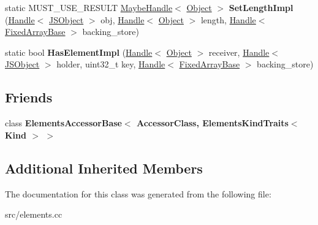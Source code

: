 \begin{DoxyCompactItemize}
\item 
\hypertarget{classv8_1_1internal_1_1_typed_elements_accessor_acb9d71e562ee58e7f2aadcebfccb999a}{}static M\+U\+S\+T\+\_\+\+U\+S\+E\+\_\+\+R\+E\+S\+U\+L\+T \hyperlink{classv8_1_1internal_1_1_maybe_handle}{Maybe\+Handle}$<$ \hyperlink{classv8_1_1internal_1_1_object}{Object} $>$ {\bfseries Set\+Length\+Impl} (\hyperlink{classv8_1_1internal_1_1_handle}{Handle}$<$ \hyperlink{classv8_1_1internal_1_1_j_s_object}{J\+S\+Object} $>$ obj, \hyperlink{classv8_1_1internal_1_1_handle}{Handle}$<$ \hyperlink{classv8_1_1internal_1_1_object}{Object} $>$ length, \hyperlink{classv8_1_1internal_1_1_handle}{Handle}$<$ \hyperlink{classv8_1_1internal_1_1_fixed_array_base}{Fixed\+Array\+Base} $>$ backing\+\_\+store)\label{classv8_1_1internal_1_1_typed_elements_accessor_acb9d71e562ee58e7f2aadcebfccb999a}

\item 
\hypertarget{classv8_1_1internal_1_1_typed_elements_accessor_a10c24f181323e51edcc62debf963f934}{}static bool {\bfseries Has\+Element\+Impl} (\hyperlink{classv8_1_1internal_1_1_handle}{Handle}$<$ \hyperlink{classv8_1_1internal_1_1_object}{Object} $>$ receiver, \hyperlink{classv8_1_1internal_1_1_handle}{Handle}$<$ \hyperlink{classv8_1_1internal_1_1_j_s_object}{J\+S\+Object} $>$ holder, uint32\+\_\+t key, \hyperlink{classv8_1_1internal_1_1_handle}{Handle}$<$ \hyperlink{classv8_1_1internal_1_1_fixed_array_base}{Fixed\+Array\+Base} $>$ backing\+\_\+store)\label{classv8_1_1internal_1_1_typed_elements_accessor_a10c24f181323e51edcc62debf963f934}

\end{DoxyCompactItemize}
\subsection*{Friends}
\begin{DoxyCompactItemize}
\item 
\hypertarget{classv8_1_1internal_1_1_typed_elements_accessor_ab3a9f9e1457f87da97381b612cf947ca}{}class {\bfseries Elements\+Accessor\+Base$<$ Accessor\+Class, Elements\+Kind\+Traits$<$ Kind $>$ $>$}\label{classv8_1_1internal_1_1_typed_elements_accessor_ab3a9f9e1457f87da97381b612cf947ca}

\end{DoxyCompactItemize}
\subsection*{Additional Inherited Members}


The documentation for this class was generated from the following file\+:\begin{DoxyCompactItemize}
\item 
src/elements.\+cc\end{DoxyCompactItemize}
